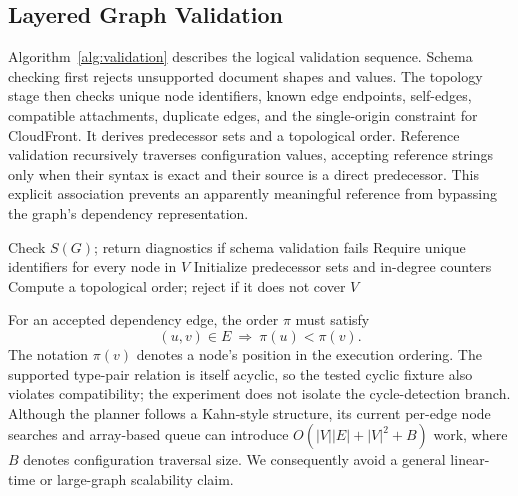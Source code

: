 \subsection{Layered Graph Validation}
Algorithm~\ref{alg:validation} describes the logical validation sequence. Schema checking first rejects unsupported document shapes and values. The topology stage then checks unique node identifiers, known edge endpoints, self-edges, compatible attachments, duplicate edges, and the single-origin constraint for CloudFront. It derives predecessor sets and a topological order. Reference validation recursively traverses configuration values, accepting reference strings only when their syntax is exact and their source is a direct predecessor. This explicit association prevents an apparently meaningful reference from bypassing the graph's dependency representation.
\begin{algorithm}[t]
\caption{Validate a proposed CloudCanvas graph}
\label{alg:validation}
Check $S(G)$; return diagnostics if schema validation fails\;
Require unique identifiers for every node in $V$\;
Initialize predecessor sets and in-degree counters\;
Compute a topological order; reject if it does not cover $V$\;
\;
\end{algorithm}
For an accepted dependency edge, the order $\pi$ must satisfy
\begin{equation}
 (u,v)\in E\ \Longrightarrow\ \pi(u)<\pi(v).
 \label{eq:order}
\end{equation}
The notation $\pi(v)$ denotes a node's position in the execution ordering. The supported type-pair relation is itself acyclic, so the tested cyclic fixture also violates compatibility; the experiment does not isolate the cycle-detection branch. Although the planner follows a Kahn-style structure, its current per-edge node searches and array-based queue can introduce $O(|V||E|+|V|^2+B)$ work, where $B$ denotes configuration traversal size. We consequently avoid a general linear-time or large-graph scalability claim.

